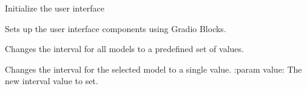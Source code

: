\documentclass[letterpaper,10pt,english]{sphinxmanual}
\begin{document}

\begin{fulllineitems}
\label{\detokenize{autoapi/src/Interface/index:src.Interface.__blocks}}
\pysigstartsignatures
\pysigline
{}
\pysigstopsignatures
\sphinxAtStartPar
Initialize the user interface

\end{fulllineitems}


\begin{fulllineitems}
\label{\detokenize{autoapi/src/Interface/index:src.Interface.__setup_ui}}
\pysigstartsignatures
\pysiglinewithargsret
{}
{}
{}
\pysigstopsignatures
\sphinxAtStartPar
Sets up the user interface components using Gradio Blocks.

\end{fulllineitems}


\begin{fulllineitems}
\label{\detokenize{autoapi/src/Interface/index:src.Interface.__change_interval_all}}
\pysigstartsignatures
\pysiglinewithargsret
{}
{}
{}
\pysigstopsignatures
\sphinxAtStartPar
Changes the interval for all models to a predefined set of values.

\end{fulllineitems}


\begin{fulllineitems}
\label{\detokenize{autoapi/src/Interface/index:src.Interface.__change_interval}}
\pysigstartsignatures
\pysiglinewithargsret
{}
{}
{}
\pysigstopsignatures
\sphinxAtStartPar
Changes the interval for the selected model to a single value.
:param value: The new interval value to set.

\end{fulllineitems}
\end{document}
